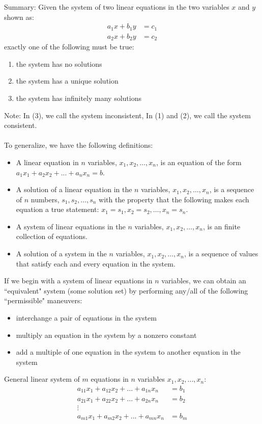 \documentclass[12pt]{article}
\begin{document}
Summary: Given the system of two linear equations in the two variables $x$ and $y$ shown as: $$ \begin{aligned} a_1x + b_1y &= c_1 \\ a_2x + b_2y &= c_2 \end{aligned} $$ \newpage
exactly one of the following must be true: 
\begin{enumerate}
\item the system has no solutions
\item the system has a unique solution 
\item the system has infinitely many solutions
\end{enumerate} 
Note: In (3), we call the system inconsistent, In (1) and (2), we call the system consistent. \\~\\
To generalize, we have the following definitions: 
\begin{itemize}
\item A linear equation in $n$ variables, $x_1, x_2, \dots, x_n$, is an equation of the form $a_1x_1 + a_2x_2 + ... + a_nx_n = b$.
\item A solution of a linear equation in the $n$ variables, $x_1, x_2, \dots, x_n$, is a sequence of $n$ numbers, $s_1, s_2, \dots , s_n $ with the property that the following makes each equation a true statement: $x_1 = s_1, x_2 = s_2, \dots, x_n = s_n $. 
\item A system of linear equations in the $n$ variables, $x_1, x_2, \dots , x_n$, is an finite collection of equations.
\item A solution of a system in the $n$ variables, $x_1, x_2, \dots, x_n$, is a sequence of values that satisfy each and every equation in the system. \end{itemize}
If we begin with a system of linear equations in $n$ variables, we can obtain an ``equivalent" system (some solution set) by performing any/all of the following ``permissible" maneuvers: 
\begin{itemize}
\item interchange a pair of equations in the system
\item multiply an equation in the system by a nonzero constant
\item add a multiple of one equation in the system to another equation in the system
\end{itemize}
General linear system of $m$ equations in $n$ variables $x_1, x_2, ..., x_n$: 
$$ \begin{aligned} a_{11}x_1 + a_{12}x_2 + ... + a_{1n}x_n &=  b_1 \\
 a_{21}x_1 + a_{22}x_2 + ... + a_{2n}x_n &=  b_2 \\ \vdots \\
 a_{m1}x_1 + a_{m2}x_2 + ... + a_{mn}x_n &=  b_m \end{aligned} $$ 
\end{document}
